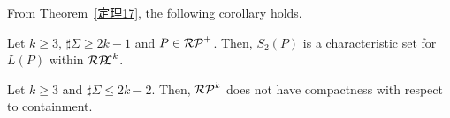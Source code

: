 From Theorem~\ref{定理17}, the following corollary holds.


\begin{col}\label{命題18}
    Let $k \geq 3$, $\sharp\Sigma \geq 2k-1$ and $P \in \mathcal{RP}^{+}$.
    Then, $S_{2}(P)$ is a characteristic set for $L(P)$ within $\mathcal{RP\!\!L}^{k}$.
\end{col}



\begin{lem}\label{補題19}
    Let $k \geq 3$ and $\sharp\Sigma \leq 2k-2$.
    Then, $\mathcal{RP}^{k}$ does not have compactness with respect to containment.
\end{lem}


